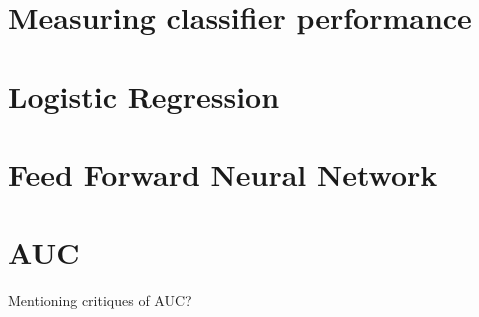 \section{Measuring classifier performance}\label{sec:classifier-performance}




\section{Logistic Regression}\label{sec:logistic-regression}




\section{Feed Forward Neural Network}\label{sec:feed-forward-neural-network}




\section{AUC}\label{sec:theory:auc}
Mentioning critiques of AUC?

